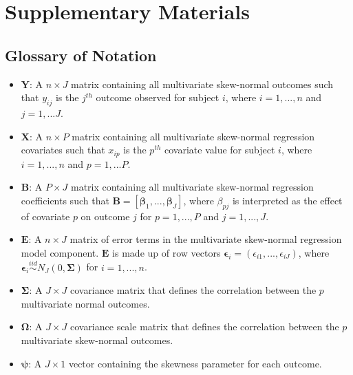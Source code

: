 \documentclass{article}
\begin{document}
\section*{Supplementary Materials}

\subsection{Glossary of Notation}

\begin{itemize}

    \item $\mathbf{Y}$: A $n \times J$ matrix containing all multivariate skew-normal  outcomes such that $y_{ij}$ is the $j^{th}$ outcome observed for subject $i$, where $i = 1,...,n$ and $j = 1,...J$.
    
    \item $\mathbf{X}$: A $n \times P$ matrix containing all multivariate skew-normal regression covariates such that $x_{ip}$ is the $p^{th}$ covariate value for subject $i$, where $i = 1,...,n$ and $p = 1,...P$.
    
    \item $\mathbf{B}$: A $P \times J$ matrix containing all multivariate skew-normal regression coefficients such that $\mathbf{B} = \left [ \boldsymbol\beta_1,...,\boldsymbol\beta_J \right ]$, where $\beta_{pj}$ is interpreted as the effect of covariate $p$ on outcome $j$ for $p = 1,...,P$ and $j = 1,...,J$.
    
    \item $\mathbf{E}$: A $n \times J$ matrix of error terms in the multivariate skew-normal regression model component. $\mathbf{E}$ is made up of row vectors $\boldsymbol\epsilon_i = (\epsilon_{i1},...,\epsilon_{iJ})$, where $ \boldsymbol\epsilon_i \stackrel{iid}{\sim} N_J(0, \boldsymbol\Sigma)$ for $i = 1,...,n$.
    
    \item $\boldsymbol\Sigma$: A $J \times J$ covariance matrix that defines the correlation between the $p$ multivariate normal outcomes. 
    
    \item $\boldsymbol\Omega$: A $J \times J$ covariance scale matrix that defines the correlation between the $p$ multivariate skew-normal outcomes. 
    
    \item $\boldsymbol\psi$: A $J \times 1$ vector containing the skewness parameter for each outcome.
    

\end{itemize}
\end{document}
